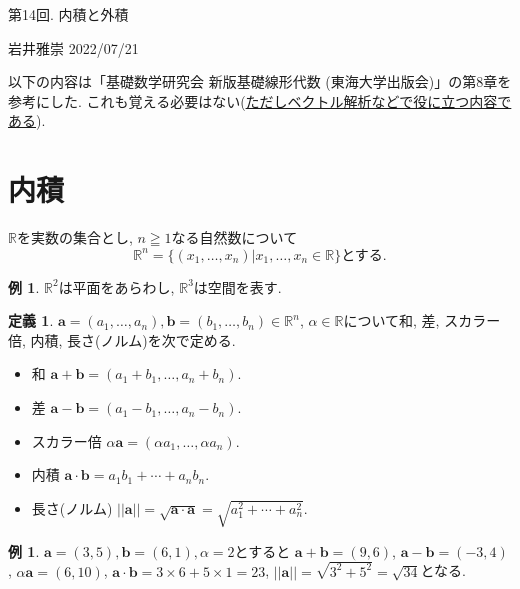 \documentclass[dvipdfmx,a4paper,11pt]{article}
\newcommand{\R}{\mathbb{R}}
\theoremstyle{definition}
\newtheorem{dfn}[thm]{定義}
\newtheorem{exa}[thm]{例}
\begin{document}
 \newpage


\begin{center}
{\Large 第14回. 内積と外積} 
\end{center}

\begin{flushright}
 岩井雅崇 2022/07/21
\end{flushright}

以下の内容は「基礎数学研究会 新版基礎線形代数 (東海大学出版会)」の第8章を参考にした. 
これも覚える必要はない(\underline{ただしベクトル解析などで役に立つ内容である}).

\section{内積}

$\R$を実数の集合とし, $n \geqq1$なる自然数について
$$
\R^n  = \{ (x_1, \ldots, x_n) | x_1, \ldots, x_n \in \R\} \text{とする.}
$$
\begin{exa}
$\R^2$は平面をあらわし, $\R^3$は空間を表す.
\end{exa}

\begin{tcolorbox}[
    colback = white,
    colframe = green!35!black,
    fonttitle = \bfseries,
    breakable = true]
    \begin{dfn}
$\bm{a}=(a_1, \ldots, a_n), \bm{b}=(b_1, \ldots, b_n)\in \R^n$, $\alpha \in \R$について和, 差, スカラー倍, 内積, 長さ(ノルム)を次で定める.
\begin{itemize}
\item 和 $\bm{a} + \bm{b} = (a_1 + b_1, \ldots, a_n + b_n)$.
\item 差 $\bm{a} - \bm{b} = (a_1 - b_1, \ldots, a_n - b_n)$.
\item スカラー倍 $\alpha \bm{a} = (\alpha a_1, \ldots, \alpha a_n)$.
\item 内積 $\bm{a} \cdot\bm{b} = a_1 b_1 + \cdots + a_n b_n $.
\item 長さ(ノルム) $||\bm{a}||= \sqrt{\bm{a} \cdot\bm{a}} = \sqrt{a_{1}^{2}+ \cdots + a_{n}^{2}}$.
\end{itemize}
    \end{dfn}
 \end{tcolorbox}

\begin{exa}
$\bm{a}=(3,5), \bm{b} = (6,1), \alpha=2$とすると
$\bm{a} + \bm{b} =(9,6)$, $\bm{a} - \bm{b} =(-3,4)$, $\alpha \bm{a}= (6,10)$, 
$\bm{a} \cdot\bm{b} = 3 \times 6 + 5 \times 1 =23$, $||\bm{a}||=\sqrt{3^2 + 5^2}= \sqrt{34}$となる.
\end{exa}
\end{document}
